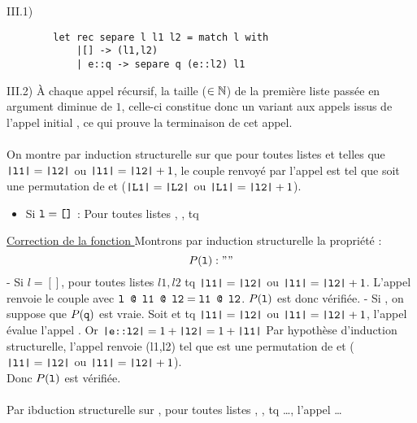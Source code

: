 \begin{question}{III.1) }{}
    \begin{verbatim}
        let rec separe l l1 l2 = match l with
            |[] -> (l1,l2)
            | e::q -> separe q (e::l2) l1
    \end{verbatim}
\end{question}

\begin{question}{III.2) }{}
    À chaque appel récursif, la taille ($\in \mathbb{N}$) de la première liste passée en argument diminue de $1$, celle-ci constitue donc un variant aux appels issus de l'appel initial , ce qui prouve la terminaison de cet appel. \\ \\
    On montre par induction structurelle sur  que pour toutes listes  et  telles que $\texttt{|l1|} = \texttt{|l2|}$ ou $\texttt{|l1|} = \texttt{|l2|} + 1$, le couple  renvoyé par l'appel  est tel que  soit une permutation de  et ($\texttt{|L1|} = \texttt{|L2|}$ ou $\texttt{|L1|} = \texttt{|l2|}+1$). \begin{itemize}
        \item Si $\texttt{l} = \texttt{[]}$ : Pour toutes listes , , tq 
    \end{itemize}


    \underline{Correction de la fonction }
    Montrons par induction structurelle la propriété : $$P(\texttt{l}) : ""$$
    - Si $l = []$, pour toutes listes $l1,l2$ tq $\texttt{|l1|} = \texttt{|l2|}$ ou $\texttt{|l1|} = \texttt{|l2|} + 1$. L'appel  renvoie le couple  avec $\texttt{l @ l1 @ l2} = \texttt{l1 @ l2}$. $P(\texttt{l})$ est donc vérifiée.
    - Si , on suppose que $P(\texttt{q})$ est vraie.
    Soit  et  tq $\texttt{|l1|} = \texttt{|l2|}$ ou $\texttt{|l1|} = \texttt{|l2|} + 1$, l'appel  évalue l'appel . Or $\texttt{|e::l2|} = 1 + \texttt{|l2|} = 1 + \texttt{|l1|}$
    Par hypothèse d'induction structurelle, l'appel  renvoie (l1,l2) tel que  est une permutation de  et ($\texttt{|l1|} = \texttt{|l2|}$ ou $\texttt{|l1|} = \texttt{|l2|} + 1$). \\ Donc $P(\texttt{l})$ est vérifiée. \\ \\
    Par ibduction structurelle sur , pour toutes listes , ,  tq \dots, l'appel  \dots
\end{question}

